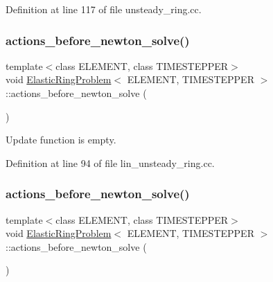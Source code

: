 Definition at line 117 of file unsteady\+\_\+ring.\+cc.

\mbox{\label{classElasticRingProblem_aac5f3adac1e1a42492bd428eeb732a3d}} 
\subsubsection{\texorpdfstring{actions\+\_\+before\+\_\+newton\+\_\+solve()}{actions\_before\_newton\_solve()}\hspace{0.1cm}{\footnotesize\ttfamily [1/2]}}
{\footnotesize\ttfamily template$<$class E\+L\+E\+M\+E\+NT, class T\+I\+M\+E\+S\+T\+E\+P\+P\+ER$>$ \\
void \hyperlink{classElasticRingProblem}{Elastic\+Ring\+Problem}$<$ E\+L\+E\+M\+E\+NT, T\+I\+M\+E\+S\+T\+E\+P\+P\+ER $>$\+::actions\+\_\+before\+\_\+newton\+\_\+solve (\begin{DoxyParamCaption}{ }\end{DoxyParamCaption})\hspace{0.3cm}{\ttfamily [inline]}}



Update function is empty. 



Definition at line 94 of file lin\+\_\+unsteady\+\_\+ring.\+cc.

\mbox{\label{classElasticRingProblem_aac5f3adac1e1a42492bd428eeb732a3d}} 
\subsubsection{\texorpdfstring{actions\+\_\+before\+\_\+newton\+\_\+solve()}{actions\_before\_newton\_solve()}\hspace{0.1cm}{\footnotesize\ttfamily [2/2]}}
{\footnotesize\ttfamily template$<$class E\+L\+E\+M\+E\+NT, class T\+I\+M\+E\+S\+T\+E\+P\+P\+ER$>$ \\
void \hyperlink{classElasticRingProblem}{Elastic\+Ring\+Problem}$<$ E\+L\+E\+M\+E\+NT, T\+I\+M\+E\+S\+T\+E\+P\+P\+ER $>$\+::actions\+\_\+before\+\_\+newton\+\_\+solve (\begin{DoxyParamCaption}{ }\end{DoxyParamCaption})\hspace{0.3cm}{\ttfamily [inline]}}



